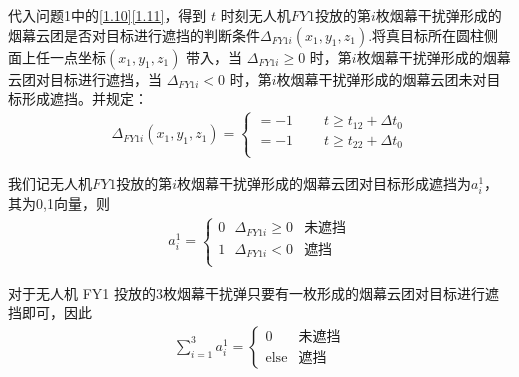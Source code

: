 \documentclass[../main.tex]{subfiles}
\begin{document}
\begin{itemize}
\par 代入问题1中的\eqref{1.10}\eqref{1.11}，得到 $t$ 时刻无人机$FY1$投放的第$i$枚烟幕干扰弹形成的烟幕云团是否对目标进行遮挡的判断条件$\Delta _{FY1i}\left( x_1,y_1,z_1 \right) $.将真目标所在圆柱侧面上任一点坐标$(x_1, y_1, z_1)$ 带入，当 $\Delta _{FY1i} \geq 0$ 时，第$i$枚烟幕干扰弹形成的烟幕云团对目标进行遮挡，当 $\Delta _{FY1i} < 0$ 时，第$i$枚烟幕干扰弹形成的烟幕云团未对目标形成遮挡。并规定： 
\begin{align}\label{14.9}
	\Delta _{FY1i}\left( x_1,y_1,z_1 \right) =\left\{ \begin{array}{l}
	=-1\ \ \ \ \ \ \ \ \ \ t\ge t_{12}+\Delta t_0\\
	=-1\ \ \ \ \ \ \ \ \ \ t\ge t_{22}+\Delta t_0\\
\end{array} \right.
\end{align}





我们记无人机$FY1$投放的第$i$枚烟幕干扰弹形成的烟幕云团对目标形成遮挡为$a_{i}^{1}$，其为0,1向量，则
\begin{align}
a_{i}^{1}=\begin{cases}
	0\ \ \ \Delta _{FY1i}\geq 0&		\text{未遮挡}\\
	1\ \ \ \Delta _{FY1i}<0&		\text{遮挡}\\
\end{cases}
\end{align}\label{11.7}
\par 对于无人机 FY1 投放的3枚烟幕干扰弹只要有一枚形成的烟幕云团对目标进行遮挡即可，因此
\begin{align}
\sum_{i=1}^{3} a_{i}^{1} = 
\begin{cases} 
0 & \text{未遮挡} \\
\text{else} & \text{遮挡}
\end{cases}
\end{align}




\end{itemize}
\end{document}
